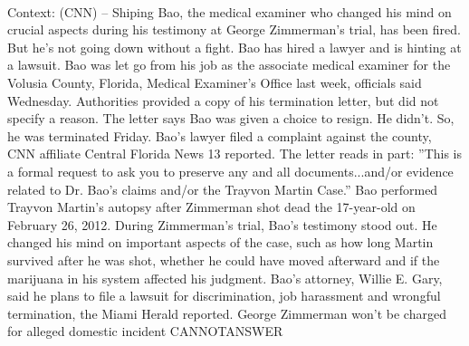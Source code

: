 \documentclass[11pt,a4paper, onecolumn]{article}
\begin{document}
\\ Context: (CNN) -- Shiping Bao, the medical examiner who changed his mind on crucial aspects during his testimony at George Zimmerman's trial, has been fired. But he's not going down without a fight. Bao has hired a lawyer and is hinting at a lawsuit. Bao was let go from his job as the associate medical examiner for the Volusia County, Florida, Medical Examiner's Office last week, officials said Wednesday. Authorities provided a copy of his termination letter, but did not specify a reason. The letter says Bao was given a choice to resign. He didn't. So, he was terminated Friday. Bao's lawyer filed a complaint against the county, CNN affiliate Central Florida News 13 reported. The letter reads in part: ''This is a formal request to ask you to preserve any and all documents...and/or evidence related to Dr. Bao's claims and/or the Trayvon Martin Case.'' Bao performed Trayvon Martin's autopsy after Zimmerman shot dead the 17-year-old on February 26, 2012. During Zimmerman's trial, Bao's testimony stood out. He changed his mind on important aspects of the case, such as how long Martin survived after he was shot, whether he could have moved afterward and if the marijuana in his system affected his judgment. Bao's attorney, Willie E. Gary, said he plans to file a lawsuit for discrimination, job harassment and wrongful termination, the Miami Herald reported. George Zimmerman won't be charged for alleged domestic incident CANNOTANSWER
\end{document}
